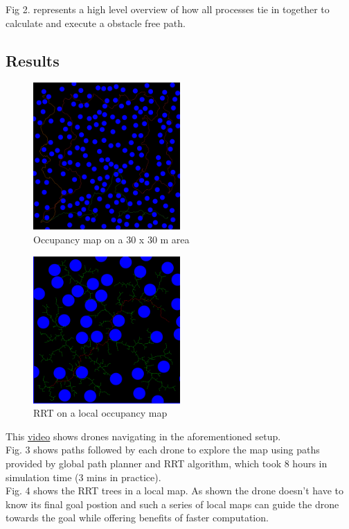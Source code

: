 Fig 2. represents a high level overview of how all processes tie in together to calculate and execute a obstacle free path.

\subsection{Results}
\begin{figure}[h]
\centering
\includegraphics[width=0.5\textwidth]{images/preview_map_frame_11193.png}
\caption{Occupancy map on a 30 x 30 m area}
\end{figure}

\begin{figure}[h]
\centering
\includegraphics[width=0.5\textwidth]{images/rrt_drone_2_iter_0.png}
\caption{RRT on a local occupancy map}
\end{figure}

This \href{https://www.youtube.com/watch?v=JBWNEh0Fis4&ab_channel=ShantnavAgarwal}{video} shows drones navigating in the aforementioned setup.\\

Fig. 3 shows paths followed by each drone to explore the map using paths provided by global path planner and RRT algorithm, which took 8 hours in simulation time (3 mins in practice). \\


Fig. 4 shows the RRT trees in a local map. As shown the drone doesn't have to know its final goal postion and such a series of local maps can guide the drone towards the goal while offering benefits of faster computation.